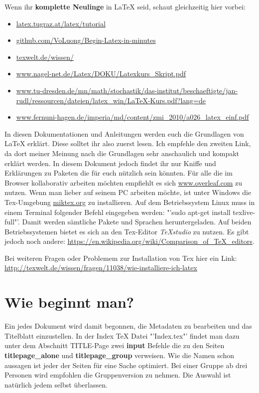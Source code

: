 Wenn ihr \textbf{komplette Neulinge} in \LaTeX{} seid, schaut gleichzeitig hier vorbei:
\begin{itemize}
	\item \url{latex.tugraz.at/latex/tutorial}
	\item \url{github.com/VoLuong/Begin-Latex-in-minutes}
	\item \url{texwelt.de/wissen/}
	\item \url{www.nagel-net.de/Latex/DOKU/Latexkurs_Skript.pdf}
	\item \url{www.tu-dresden.de/mn/math/stochastik/das-institut/beschaeftigte/jan-rudl/ressourcen/dateien/latex_win/LaTeX-Kurs.pdf?lang=de}
	\item \url{www.fernuni-hagen.de/imperia/md/content/zmi_2010/a026_latex_einf.pdf}
\end{itemize} 
In diesen Dokumentationen und Anleitungen werden euch die Grundlagen von \LaTeX{} erklärt. Diese solltet ihr also zuerst lesen. Ich empfehle den zweiten Link, da dort meiner Meinung nach die Grundlagen sehr anschaulich und kompakt erklärt werden. In diesem Dokument jedoch findet ihr nur Kniffe und Erklärungen zu Paketen die für euch nützlich sein könnten.
Für alle die im Browser kollaborativ arbeiten möchten empfiehlt es sich \url{www.overleaf.com} zu nutzen. Wenn man lieber auf seinem PC arbeiten möchte, ist unter Windows die Tex-Umgebung \url{miktex.org} zu installieren. Auf dem Betriebssystem Linux muss in einem Terminal folgender Befehl eingegeben werden: "'sudo apt-get install texlive-full"'. Damit werden sämtliche Pakete und Sprachen heruntergeladen. Auf beiden Betriebssystemen bietet es sich an den Tex-Editor \emph{TeXstudio} zu nutzen. Es gibt jedoch noch andere: \url{https://en.wikipedia.org/wiki/Comparison_of_TeX_editors}.

Bei weiteren Fragen oder Problemem zur Installation von Tex hier ein Link:\\
\url{http://texwelt.de/wissen/fragen/11038/wie-installiere-ich-latex}

\section{Wie beginnt man?}

Ein jedes Dokument wird damit begonnen, die Metadaten zu bearbeiten und das Titelblatt einzustellen. In der Index TeX Datei "'Index.tex"' findet man dazu unter dem Abschnitt TITLE-Page zwei \textbf{input} Befehle die zu den Seiten \textbf{titlepage\_alone} und \textbf{titlepage\_group} verweisen. Wie die Namen schon aussagen ist jeder der Seiten für eine Sache optimiert. Bei einer Gruppe ab drei Personen wird empfohlen die Gruppenversion zu nehmen. Die Auswahl ist natürlich jedem selbst überlassen.\\

